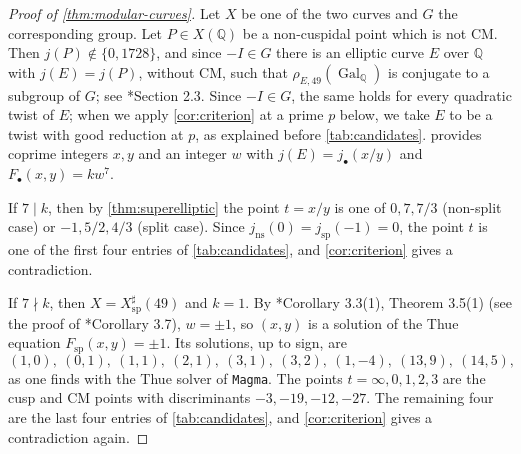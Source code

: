 \documentclass[12pt]{amsart}
\newcommand{\Q}{\mathbb{Q}}
\DeclareMathOperator{\ns}{ns}
\DeclareMathOperator{\spc}{sp}
\DeclareMathOperator{\Gal}{Gal}
\newcommand{\Magma}{\texttt{Magma}\xspace}
\numberwithin{equation}{section}
\theoremstyle{definition}
\begin{document}
\begin{proof}[Proof of \cref{thm:modular-curves}]
  Let $X$ be one of the two curves and $G$ the corresponding group. Let $P \in
  X(\Q)$ be a non-cuspidal point which is not CM. Then $j(P) \notin \{0,1728\}$,
  and since $-I \in G$ there is an elliptic curve $E$ over $\Q$ with $j(E) =
  j(P)$, without CM, such that $\rho_{E,49}(\Gal_\Q)$ is conjugate to a subgroup
  of $G$; see \cite{RSZB-22}*{Section 2.3}. Since $-I \in G$, the same holds
  for every quadratic twist of $E$; when we apply \cref{cor:criterion} at a
  prime $p$ below, we take $E$ to be a twist with good reduction at $p$, as
  explained before \cref{tab:candidates}.  provides coprime
  integers $x,y$ and an integer $w$ with $j(E) = j_{\bullet}(x/y)$ and $F_{\bullet}(x,y)
  = kw^{7}$.

  If $7 \mid k$, then by \cref{thm:superelliptic} the point $t = x/y$ is one of
  $0, 7, 7/3$ (non-split case) or $-1, 5/2, 4/3$ (split case). Since $j_{\ns}(0)
  = j_{\spc}(-1) = 0$, the point $t$ is one of the first four entries of
  \cref{tab:candidates}, and \cref{cor:criterion} gives a contradiction.

  If $7 \nmid k$, then $X = X_{\spc}^{\sharp}(49)$ and $k = 1$. By
  \cite{Furio--Lombardo26}*{Corollary 3.3(1), Theorem 3.5(1)} (see the proof of
  \cite{Furio--Lombardo26}*{Corollary 3.7}), $w = \pm 1$, so $(x,y)$ is a solution of
  the Thue equation $F_{\spc}(x,y) = \pm 1$. Its solutions, up to sign, are
  \begin{equation}
    \label{eq:thue-solutions}
    (1,0),\ (0,1),\ (1,1),\ (2,1),\ (3,1),\ (3,2),\ (1,-4),\ (13,9),\ (14,5),
  \end{equation}
  as one finds with the Thue solver of \Magma{}. The points $t = \infty, 0, 1,
  2, 3$ are the cusp and CM points with discriminants $-3, -19, -12, -27$.
  The remaining four are the last four entries of \cref{tab:candidates}, and
  \cref{cor:criterion} gives a contradiction again.


\end{proof}
\end{document}
